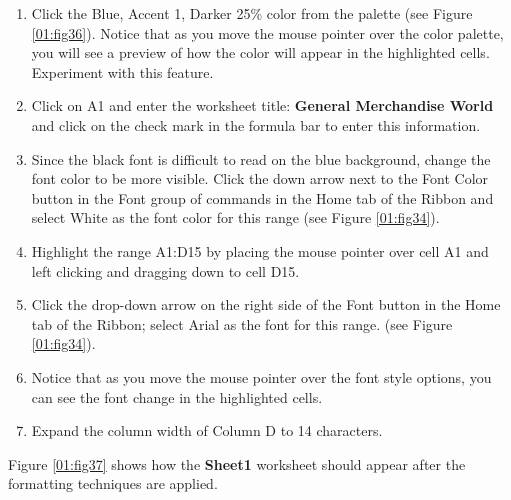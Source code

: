\begin{enumerate}[resume]
	\item Click the Blue, Accent 1, Darker 25\% color from the palette (see Figure \ref{01:fig36}). Notice that as you move the mouse pointer over the color palette, you will see a preview of how the color will appear in the highlighted cells. Experiment with this feature.
	\item Click on \textsf{A1} and enter the worksheet title: \textbf{General Merchandise World} and click on the check mark in the formula bar to enter this information.
	\item Since the black font is difficult to read on the blue background, change the font color to be more visible. Click the down arrow next to the Font Color button in the Font group of commands in the Home tab of the Ribbon and select White as the font color for this range (see Figure \ref{01:fig34}).
	\item Highlight the range \textsf{A1:D15} by placing the mouse pointer over cell \textsf{A1} and left clicking and dragging down to cell \textsf{D15}.
	\item Click the drop-down arrow on the right side of the Font button in the Home tab of the Ribbon; select Arial as the font for this range. (see Figure \ref{01:fig34}).
	\item Notice that as you move the mouse pointer over the font style options, you can see the font change in the highlighted cells.
	\item Expand the column width of Column \textsf{D} to 14 characters.
\end{enumerate}

Figure \ref{01:fig37} shows how the \textbf{Sheet1} worksheet should appear after the formatting techniques are applied.

